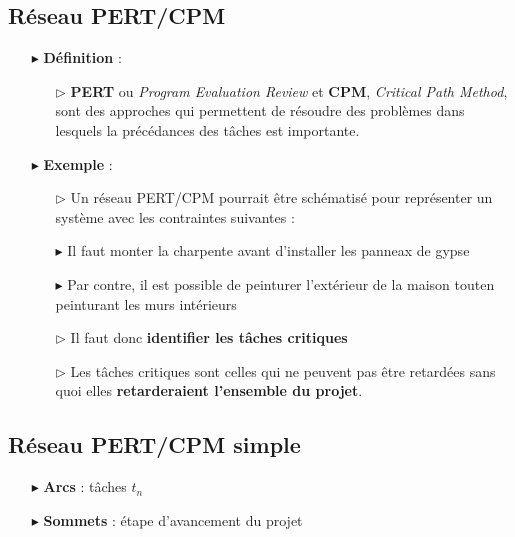 \documentclass{report}
\begin{document}
\begin{multicols*}{2}
\section{Réseau PERT/CPM}
\begin{itemize}
    \item [$\blacktriangleright$ ] \textbf{Définition} :  
        \begin{itemize}
            \item [$\rhd$ ] \textbf{PERT} ou 
                \textit{Program Evaluation Review} et \textbf{CPM}, 
                \textit{Critical Path Method}, sont des approches qui 
                permettent de résoudre des problèmes dans lesquels 
                la précédances des tâches est importante. 
        \end{itemize}

    \item [$\blacktriangleright$ ] \textbf{Exemple} :  
        \begin{itemize}
            \item [$\rhd$ ] Un réseau PERT/CPM pourrait être 
                schématisé pour représenter un système avec les contraintes 
                suivantes :
            \item [$\blacktriangleright$ ] Il faut monter la charpente 
                avant d'installer 
                les panneax de gypse 
            \item [$\blacktriangleright$ ]  Par contre, il est possible de 
                peinturer l’extérieur de la maison touten 
                peinturant les murs intérieurs
            \item [$\rhd$ ] Il faut donc 
                \textbf{identifier les tâches critiques}  
            \item [$\rhd$ ] Les tâches critiques sont celles qui ne 
                peuvent pas être retardées sans quoi elles 
                \textbf{retarderaient l'ensemble du projet}.  
        \end{itemize}


\end{itemize}


\subsection{Réseau PERT/CPM simple}
\begin{itemize}
    \item [$\blacktriangleright$ ] \textbf{Arcs} :  tâches $t_n$  
    \item [$\blacktriangleright$ ] \textbf{Sommets} : étape d'avancement du projet  
\end{itemize}



\end{multicols*}
\end{document}
